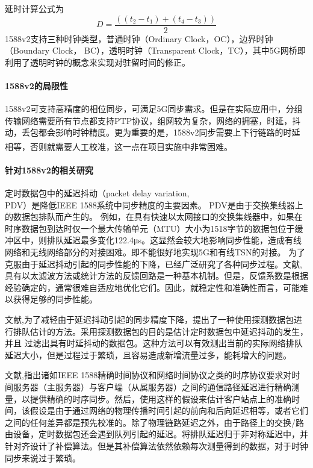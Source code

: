 \documentclass[UTF8,a4paper,12pt]{ctexart}
\numberwithin{equation}{section}
\begin{document}
	延时计算公式为
	\begin{equation}
		D = \frac{((t_2-t_1)+(t_4-t_3))}{2} 
	\end{equation}
	1588v2支持三种时钟类型，普通时钟（Ordinary Clock，OC），边界时钟（Boundary Clock， BC），透明时钟（Transparent Clock，TC），其中5G网桥即利用了透明时钟的概念来实现对驻留时间的修正。
	\paragraph{1588v2的局限性}
	1588v2可支持高精度的相位同步，可满足5G同步需求。但是在实际应用中，分组传输网络需要所有节点都支持PTP协议，组网较为复杂，网络的拥塞，时延，抖动，丢包都会影响时钟精度。更为重要的是，1588v2同步需要上下行链路的时延相等，否则就需要人工校准，这一点在项目实施中非常困难。\textsuperscript{\cite{luling20121588v2}}
	\paragraph{针对1588v2的相关研究}
	
	定时数据包中的延迟抖动（packet delay variation,\\PDV）是降低IEEE 1588系统中同步精度的主要因素。 PDV是由于交换集线器上的数据包排队而产生的。 例如，在具有快速以太网接口的交换集线器中，如果在时序数据包到达时仅一个最大传输单元（MTU）大小为1518字节的数据包位于缓冲区中，则排队延迟最多变化122.4μs。这显然会较大地影响同步性能，造成有线网络和无线网络部分的对接困难。即不能很好地实现5G和有线TSN的对接。
	为了克服由于延迟抖动引起的同步性能的下降，已经广泛研究了各种同步过程。文献\cite{murakami2009improvement},\cite{subrahmanyan2007implementation}具有以太滤波方法或统计方法的反馈回路是一种基本机制。但是，反馈系数是根据经验确定的，通常很难自适应地优化它们。因此，就稳定性和准确性而言，可能难以获得足够的同步性能。
	
	
	文献\cite{simanic2011compensation},\cite{lee2011accuracy}为了减轻由于延迟抖动引起的同步精度下降，提出了一种使用探测数据包进行排队估计的方法。采用探测数据包的目的是估计定时数据包中延迟抖动的发生，并且 过滤出具有时延抖动的数据包。这种方法可以有效测出当前的实际网络排队延迟大小，但是过程过于繁琐，且容易造成新增流量过多，能耗增大的问题。
	
	
	文献\cite{chaloupka2013efficient},\cite{karthik2019optimum}指出诸如IEEE 1588精确时间协议和网络时间协议之类的时序协议要求对时间服务器（主服务器）与客户端（从属服务器）之间的通信路径延迟进行精确测量，以提供精确的时序同步。然后，使用这样的假设来估计客户站点上的准确时间，该假设是由于通过网络的物理传播时间引起的前向和后向延迟相等，或者它们之间的任何差异都是预先校准的。除了物理链路延迟之外，由于路径上的交换/路由设备，定时数据包还会遇到队列引起的延迟。将排队延迟归于非对称延迟中，并针对齐设计了补偿算法。但是其补偿算法依然依赖每次测量得到的数据，对于时钟同步来说过于繁琐。
	
\end{document}
